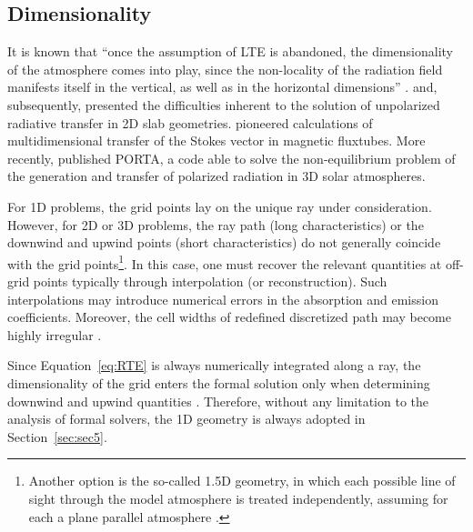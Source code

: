 \documentclass[iop,numberedappendix,twocolappendix,twocolumn]{emulateapj}
\begin{document}
\subsection{Dimensionality}\label{subsec:4.2}
%
It is known that
``once the assumption of LTE is abandoned, the dimensionality of the atmosphere comes into play, since the non-locality of the radiation field manifests itself in the vertical,
as well as in the horizontal dimensions'' \citep{delacruz_rodriguez2017}.
\citet{mihalas+auer1978} and, subsequently, \citet{kunasz1988} presented the difficulties inherent
to the solution of unpolarized radiative transfer in 2D slab geometries.
\citet{stenholm1977} pioneered calculations of multidimensional transfer of the Stokes vector in magnetic fluxtubes.
More recently, \citet{stepan+trujillo_bueno2013} published PORTA, a code able to solve the non-equilibrium problem
of the generation and transfer of polarized radiation in 3D solar atmospheres.

For 1D problems, the grid points lay on the unique ray under consideration.
However, for 2D or 3D problems, the ray path (long characteristics) or the downwind and upwind points (short characteristics)
do not generally coincide with the grid points\footnote{Another option is the so-called 1.5D geometry,
in which each possible line of sight through the model atmosphere is treated independently, assuming for each a plane parallel atmosphere \citep[e.g.,][]{stenflo1994,pereira2015}.}.
In this case, one must recover the relevant quantities at off-grid points typically through interpolation (or reconstruction).
Such interpolations may introduce numerical errors in the absorption and emission coefficients.
Moreover, the cell widths of redefined discretized path 
may become highly irregular \citep[e.g.,][]{mihalas+auer1978}.

Since Equation~\eqref{eq:RTE} is always numerically integrated along a ray,
the dimensionality of the grid enters the formal solution only when %
determining downwind and upwind quantities \citep{auer2003}.
Therefore, without any limitation to the analysis of formal solvers, the 1D geometry is always adopted in Section~\ref{sec:sec5}.
%
\end{document}
